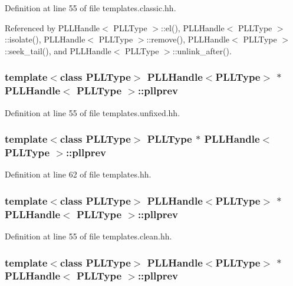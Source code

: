 Definition at line 55 of file templates.classic.hh.

Referenced by PLLHandle$<$ PLLType $>$::el(), PLLHandle$<$ PLLType $>$::isolate(), PLLHandle$<$ PLLType $>$::remove(), PLLHandle$<$ PLLType $>$::seek\_\-tail(), and PLLHandle$<$ PLLType $>$::unlink\_\-after().
\subsubsection{\setlength{\rightskip}{0pt plus 5cm}template$<$class PLLType$>$ PLLHandle$<${\bf PLLType}$>$ $\ast$ PLLHandle$<$ {\bf PLLType} $>$::pllprev\hspace{0.3cm}{\tt  [protected]}}\label{classPLLHandle_n12}




Definition at line 55 of file templates.unfixed.hh.
\subsubsection{\setlength{\rightskip}{0pt plus 5cm}template$<$class PLLType$>$ {\bf PLLType} $\ast$ PLLHandle$<$ {\bf PLLType} $>$::pllprev\hspace{0.3cm}{\tt  [protected]}}\label{classPLLHandle_n8}




Definition at line 62 of file templates.hh.
\subsubsection{\setlength{\rightskip}{0pt plus 5cm}template$<$class PLLType$>$ PLLHandle$<${\bf PLLType}$>$ $\ast$ PLLHandle$<$ {\bf PLLType} $>$::pllprev\hspace{0.3cm}{\tt  [protected]}}\label{classPLLHandle_n5}




Definition at line 55 of file templates.clean.hh.
\subsubsection{\setlength{\rightskip}{0pt plus 5cm}template$<$class PLLType$>$ PLLHandle$<${\bf PLLType}$>$ $\ast$ PLLHandle$<$ {\bf PLLType} $>$::pllprev\hspace{0.3cm}{\tt  [protected]}}\label{classPLLHandle_n2}




